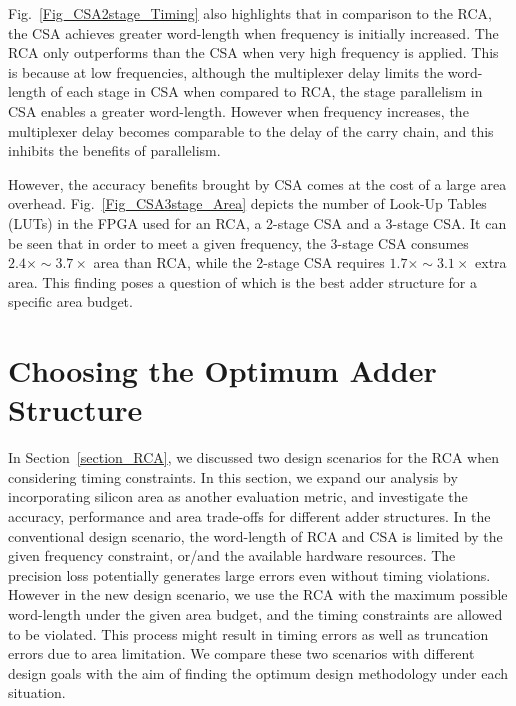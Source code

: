 \documentclass[journal]{IEEEtran}
\begin{document}

Fig.~\ref{Fig_CSA2stage_Timing} also highlights that in comparison to the RCA, the CSA achieves greater word-length when frequency is initially increased. The RCA only outperforms than the CSA when very high frequency is applied. This is because at low frequencies, although the multiplexer delay limits the word-length of each stage in CSA when compared to RCA, the stage parallelism in CSA enables a greater word-length. However when frequency increases, the multiplexer delay becomes comparable to the delay of the carry chain, and this inhibits the benefits of parallelism.


However, the accuracy benefits brought by CSA comes at the cost of a large area overhead. Fig.~\ref{Fig_CSA3stage_Area} depicts the number of Look-Up Tables (LUTs) in the FPGA used for an RCA, a 2-stage CSA and a 3-stage CSA. It can be seen that in order to meet a given frequency, the 3-stage CSA consumes $2.4\times\sim3.7\times$ area than RCA, while the 2-stage CSA requires $1.7\times\sim3.1\times$ extra area. This finding poses a question of which is the best adder structure for a specific area budget.

\section{Choosing the Optimum Adder Structure}\label{Section_OptimumAdder}
In Section~\ref{section_RCA}, we discussed two design scenarios for the RCA when considering timing constraints. In this section, we expand our analysis by incorporating silicon area as another evaluation metric, and investigate the accuracy, performance and area trade-offs for different adder structures. In the conventional design scenario, the word-length of RCA and CSA is limited by the given frequency constraint, or/and the available hardware resources. The precision loss potentially generates large errors even without timing violations. However in the new design scenario, we use the RCA with the maximum possible word-length under the given area budget, and the timing constraints are allowed to be violated. This process might result in timing errors as well as truncation errors due to area limitation. We compare these two scenarios with different design goals with the aim of finding the optimum design methodology under each situation.
\end{document}
